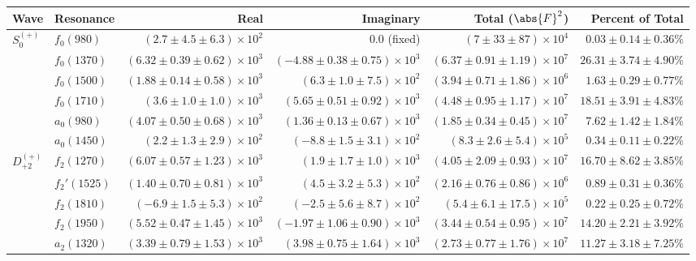 \begin{table}[ht]
    \begin{center}
        \begin{tabular}{llrrrr}\toprule
        Wave & Resonance & Real & Imaginary & Total ($\abs{F}^2$) & Percent of Total \\\midrule
$S_{0}^{(+)}$ & $f_{0}(980)$ & $(2.7 \pm 4.5 \pm 6.3) \times 10^{2}$ & $0.0$ (fixed) & $(7 \pm 33 \pm 87) \times 10^{4}$ & $0.03 \pm 0.14 \pm 0.36 \%$ \\
 & $f_{0}(1370)$ & $(6.32 \pm 0.39 \pm 0.62) \times 10^{3}$ & $(-4.88 \pm 0.38 \pm 0.75) \times 10^{3}$ & $(6.37 \pm 0.91 \pm 1.19) \times 10^{7}$ & $26.31 \pm 3.74 \pm 4.90 \%$ \\
 & $f_{0}(1500)$ & $(1.88 \pm 0.14 \pm 0.58) \times 10^{3}$ & $(6.3 \pm 1.0 \pm 7.5) \times 10^{2}$ & $(3.94 \pm 0.71 \pm 1.86) \times 10^{6}$ & $1.63 \pm 0.29 \pm 0.77 \%$ \\
 & $f_{0}(1710)$ & $(3.6 \pm 1.0 \pm 1.0) \times 10^{3}$ & $(5.65 \pm 0.51 \pm 0.92) \times 10^{3}$ & $(4.48 \pm 0.95 \pm 1.17) \times 10^{7}$ & $18.51 \pm 3.91 \pm 4.83 \%$ \\
 & $a_{0}(980)$ & $(4.07 \pm 0.50 \pm 0.68) \times 10^{3}$ & $(1.36 \pm 0.13 \pm 0.67) \times 10^{3}$ & $(1.85 \pm 0.34 \pm 0.45) \times 10^{7}$ & $7.62 \pm 1.42 \pm 1.84 \%$ \\
 & $a_{0}(1450)$ & $(2.2 \pm 1.3 \pm 2.9) \times 10^{2}$ & $(-8.8 \pm 1.5 \pm 3.1) \times 10^{2}$ & $(8.3 \pm 2.6 \pm 5.4) \times 10^{5}$ & $0.34 \pm 0.11 \pm 0.22 \%$ \\
$D_{+2}^{(+)}$ & $f_{2}(1270)$ & $(6.07 \pm 0.57 \pm 1.23) \times 10^{3}$ & $(1.9 \pm 1.7 \pm 1.0) \times 10^{3}$ & $(4.05 \pm 2.09 \pm 0.93) \times 10^{7}$ & $16.70 \pm 8.62 \pm 3.85 \%$ \\
 & $f_{2}'(1525)$ & $(1.40 \pm 0.70 \pm 0.81) \times 10^{3}$ & $(4.5 \pm 3.2 \pm 5.3) \times 10^{2}$ & $(2.16 \pm 0.76 \pm 0.86) \times 10^{6}$ & $0.89 \pm 0.31 \pm 0.36 \%$ \\
 & $f_{2}(1810)$ & $(-6.9 \pm 1.5 \pm 5.3) \times 10^{2}$ & $(-2.5 \pm 5.6 \pm 8.7) \times 10^{2}$ & $(5.4 \pm 6.1 \pm 17.5) \times 10^{5}$ & $0.22 \pm 0.25 \pm 0.72 \%$ \\
 & $f_{2}(1950)$ & $(5.52 \pm 0.47 \pm 1.45) \times 10^{3}$ & $(-1.97 \pm 1.06 \pm 0.90) \times 10^{3}$ & $(3.44 \pm 0.54 \pm 0.95) \times 10^{7}$ & $14.20 \pm 2.21 \pm 3.92 \%$ \\
 & $a_{2}(1320)$ & $(3.39 \pm 0.79 \pm 1.53) \times 10^{3}$ & $(3.98 \pm 0.75 \pm 1.64) \times 10^{3}$ & $(2.73 \pm 0.77 \pm 1.76) \times 10^{7}$ & $11.27 \pm 3.18 \pm 7.25 \%$ \\

\end{tabular}
\end{center}
\end{table}
